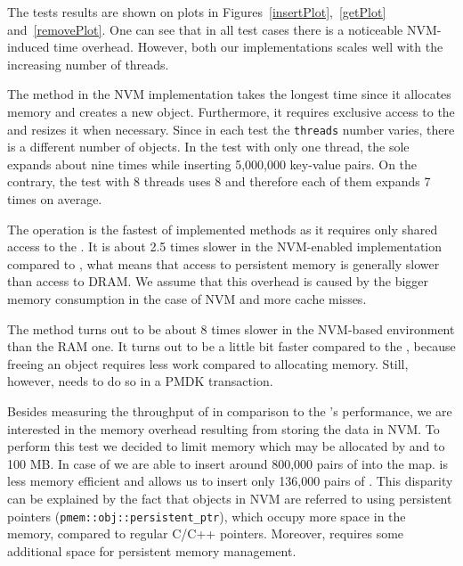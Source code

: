     The tests results are shown on plots in Figures~\ref{insertPlot},~\ref{getPlot} and~\ref{removePlot}. One can see that in all test cases there is a noticeable NVM-induced time overhead. However, both our implementations scales well with the increasing number of threads.
    
    The \insertMethod method in the NVM implementation takes the longest time since it allocates memory and creates a new object. Furthermore, it requires exclusive access to the \internalHashMap and resizes it when necessary. Since in each test the \texttt{threads} number varies, there is a different number of \internalHashMap objects. In the test with only one thread, the sole \internalHashMap expands about nine times while inserting 5,000,000 key-value pairs. On the contrary, the test with 8 threads uses 8 \internalHashMaps and therefore each of them expands 7 times on average. 
    
    The \getMethod operation is the fastest of implemented methods as it requires only shared access to the \internalHashMap.
    It is about 2.5 times slower in the NVM-enabled implementation compared to \StandardHashMap, what means that access to persistent memory is generally slower than access to DRAM. 
    We assume that this overhead is caused by the bigger memory consumption in the case of NVM and more cache misses.
    
    The \removeMethod method turns out to be about 8 times slower in the NVM-based environment than the RAM one. It turns out to be a little bit faster compared to the \insertMethod, because freeing an object requires less work compared to allocating memory. Still, however, \removeMethod needs to do so in a PMDK transaction. 
    
    Besides measuring the throughput of \PHT in comparison to the \StandardHashMap's performance, we are interested in the memory overhead resulting from storing the data in NVM. 
    To perform this test we decided to limit memory which may be allocated by \PHT and \StandardHashMap to 100 MB.
    In case of \StandardHashMap we are able to insert around 800,000 pairs of \integersMap into the map. \PHT is less memory efficient and allows us to insert only 136,000 pairs of \integersMap. 
    This disparity can be explained by the fact that objects in NVM are referred to using persistent pointers (\texttt{pmem::obj::persistent\_ptr}), which occupy more space in the memory, compared to regular C/C++ pointers. Moreover, \libpmemobjcpp requires some additional space for persistent memory management.
    
